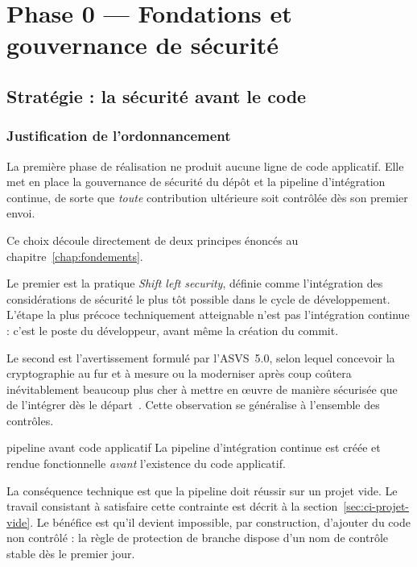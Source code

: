 \chapter{Phase 0 --- Fondations et gouvernance de sécurité}
\label{chap:phase0}

\section{Stratégie : la sécurité avant le code}

\subsection{Justification de l'ordonnancement}

La première phase de réalisation ne produit aucune ligne de code applicatif.
Elle met en place la gouvernance de sécurité du dépôt et la pipeline
d'intégration continue, de sorte que \emph{toute} contribution ultérieure soit
contrôlée dès son premier envoi.

Ce choix découle directement de deux principes énoncés au
chapitre~\ref{chap:fondements}.

Le premier est la pratique  \emph{Shift left security}, définie comme
l'intégration des considérations de sécurité le plus tôt possible dans le cycle
de développement. L'étape la plus précoce techniquement atteignable n'est pas
l'intégration continue : c'est le poste du développeur, avant même la création
du commit.

Le second est l'avertissement formulé par l'ASVS~5.0, selon lequel concevoir la
cryptographie au fur et à mesure ou la moderniser après coup coûtera
inévitablement beaucoup plus cher à mettre en œuvre de manière sécurisée que de
l'intégrer dès le départ~\cite{owaspasvs5}. Cette observation se généralise à
l'ensemble des contrôles.

\begin{decision}{pipeline avant code applicatif}
La pipeline d'intégration continue est créée et rendue fonctionnelle
\emph{avant} l'existence du code applicatif.

La conséquence technique est que la pipeline doit réussir sur un projet vide.
Le travail consistant à satisfaire cette contrainte est décrit à la
section~\ref{sec:ci-projet-vide}. Le bénéfice est qu'il devient impossible, par
construction, d'ajouter du code non contrôlé : la règle de protection de branche
dispose d'un nom de contrôle stable dès le premier jour.
\end{decision}


